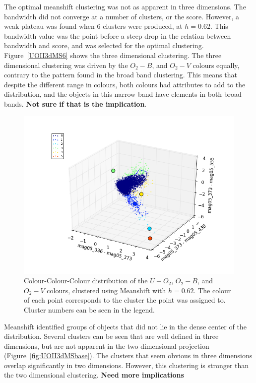 The optimal meanshift clustering was not as apparent in three dimensions.
The bandwidth did not converge at a number of clusters, or the score.
However, a weak plateau was found when 6 clusters were produced, at $h = 0.62$.
This bandwidth value was the point before a steep drop in the relation between bandwidth and score, and was selected for the optimal clustering.
Figure~\ref{UOII3dMS6} shows the three dimensional clustering. 
The three dimensional clustering was driven by the $O_{2} - B$, and $O_{2} - V$ colours equally, contrary to the pattern found in the broad band clustering.
This means that despite the different range in colours, both colours had attributes to add to the distribution, and the objects in this narrow band have elements in both broad bands. 
\textbf{Not sure if that is the implication}. 

\begin{figure}
\centering
\includegraphics[width=\linewidth]{figs/successful/meanshift_3d_6cl_mag05_336-mag05_373vsmag05_373-mag05_438vsmag05_373-mag05_555}
\caption{Colour-Colour-Colour distribution of the $U-O_{2}$, $O_{2} - B$, and $O_{2} - V$ colours, clustered using Meanshift with $h=0.62$. The colour of each point corresponds to the cluster the point was assigned to. Cluster numbers can be seen in the legend.}
\label{fig:UOII3dMS6}
\end{figure}

Meanshift identified groups of objects that did not lie in the dense center of the distribution.
Several clusters can be seen that are well defined in three dimensions, but are not apparent in the two dimensional projection (Figure~\ref{fig:UOII3dMSbase}).
The clusters that seem obvious in three dimensions overlap significantly in two dimensions.
However, this clustering is stronger than the two dimensional clustering.
\textbf{Need more implications}

